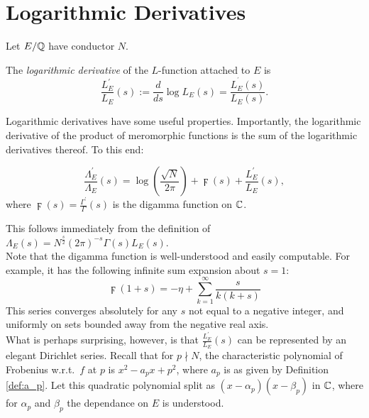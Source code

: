 \documentclass[10pt]{article}
\newcommand{\pr}{^{\prime}}
\newcommand{\Les}{L_E(s)}
\newcommand{\Lams}{\Lambda_E(s)}
\newcommand{\ldLes}{\frac{L_E\pr}{L_E}(s)}
\newcommand{\ldLe}[1]{\frac{L_E\pr}{L_E}\left(#1\right)}
\newcommand{\ldLam}[1]{\frac{\Lambda_E\pr}{\Lambda_E}\left(#1\right)}
\begin{document}

\newpage
\section{Logarithmic Derivatives}\label{sec:log_derivs}

Let $E/\mathbb{Q}$  have conductor $N$.
\begin{definition}
The {\it logarithmic derivative} of the $L$-function attached to $E$ is
\begin{equation}
\ldLes := \frac{d}{ds} \log \Les = \frac{L_E^{\pr}(s)}{\Les}.
\end{equation}
\end{definition}
Logarithmic derivatives have some useful properties. Importantly, the logarithmic derivative of the product of meromorphic functions is the sum of the logarithmic derivatives thereof. To this end:
\begin{proposition}
\begin{equation}\label{eqn:logderiv_relation}
\ldLam{s} = \log\left(\frac{\sqrt{N}}{2\pi}\right) + \digamma(s) + \ldLe{s},
\end{equation}
where $\digamma(s) = \frac{\Gamma\pr}{\Gamma}(s)$ is the digamma function on $\mathbb{C}$.
\end{proposition}
This follows immediately from the definition of $\Lams = N^{\frac{s}{2}}(2\pi)^{-s}\Gamma(s)\Les$. \\

Note that the digamma function is well-understood and easily computable. For example, it has the following infinite sum expansion about $s=1$:
\begin{equation}\label{eqn:digamma_sum}
\digamma(1+s) = -\eta + \sum_{k=1}^{\infty} \frac{s}{k(k+s)}
\end{equation}
This series converges absolutely for any $s$ not equal to a negative integer, and uniformly on sets bounded away from the negative real axis.\\

What is perhaps surprising, however, is that $\ldLe{s}$ can be represented by an elegant Dirichlet series. Recall that for $p \nmid N$, the characteristic polynomial of Frobenius w.r.t.~$f$ at $p$ is $x^2 - a_p x + p^2$, where $a_p$ is as given by Definition \ref{def:a_p}. Let this quadratic polynomial split as $(x-\alpha_p)(x-\beta_p)$ in $\mathbb{C}$, where for $\alpha_p$ and $\beta_p$ the dependance on $E$ is understood. \\
\end{document}
